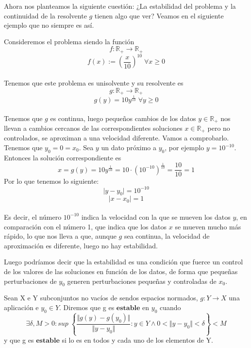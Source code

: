 Ahora nos planteamos la siguiente cuestión: ¿La estabilidad del problema y la continuidad de la resolvente $g$ tienen algo que ver? Veamos en el siguiente ejemplo que no siempre es así.

\begin{ejemplo}
Consideremos el problema siendo la función $$f : \mathbb{R}_+ \rightarrow \mathbb{R}_+$$ $$f(x) := \left( \frac{x}{10} \right) ^{10} \; \forall x \geq 0$$\\
Tenemos que este problema es unisolvente y su resolvente es $$g : \mathbb{R}_+ \rightarrow \mathbb{R}_+$$ $$g(y) = 10y^{\frac{1}{10}} \; \forall y \geq 0$$\\
Tenemos que $g$ es continua, luego pequeños cambios de los datos $y \in \mathbb{R}_+$ nos llevan a cambios cercanos de las correspondientes soluciones $x \in \mathbb{R}_+$ pero no controlados, se aproximan a una velocidad diferente. Vamos a comprobarlo.\\
Tenemos que $y_0 = 0 = x_0$. Sea $y$ un dato próximo a $y_0$, por ejemplo $y = 10^{-10}$. Entonces la solución correspondiente es $$x = g(y) = 10y^{\frac{1}{10}} = 10 \cdot \left( 10^{-10} \right) ^{\frac{1}{10}} = \frac{10}{10} = 1$$ Por lo que tenemos lo siguiente:\\
$$\vert y - y_0 \vert = 10^{-10}$$ $$\vert x - x_0 \vert = 1$$\\
Es decir, el número $10^{-10}$ indica la velocidad con la que se mueven los datos $y$, en comparación con el número 1, que indica que los datos $x$ se mueven mucho más rápido, lo que nos lleva a que, aunque $g$ sea continua, la velocidad de aproximación es diferente, luego no hay estabilidad.
\end{ejemplo}

Luego podríamos decir que la estabilidad es una condición que fuerce un control de los valores de las soluciones en función de los datos, de forma que pequeñas perturbaciones de $y_0$ generen perturbaciones pequeñas y controladas de $x_0$.

\begin{ndef}
Sean X e Y subconjuntos no vacíos de sendos espacios normados, $g : Y \rightarrow X$ una aplicación e $y_0 \in Y$. Diremos que g es $\textbf{estable}$ en $y_0$ cuando
 \[ \exists \delta , M > 0 : sup \; \left\lbrace \frac{ \Vert g(y) - g(y_0) \Vert }{ \Vert y - y_0 \Vert } : y \in Y \wedge 0 < \Vert y - y_0 \Vert < \delta \right\rbrace < M \]
y que g es $\textbf{estable}$ si lo es en todos y cada uno de los elementos de Y.
\end{ndef}


